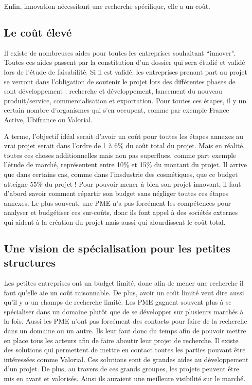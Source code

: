 \documentclass[a4paper,12pt]{report}
\begin{document}
		Enfin, innovation nécessitant une recherche spécifique, elle a un coût. 
		
			
		\subsection{Le coût élevé}
		Il existe de nombreuses aides pour toutes les entreprises souhaitant “innover”. Toutes ces aides passent par la constitution d’un dossier qui sera étudié et validé lors de l’étude de faisabilité. Si il est validé, les entreprises prenant part au projet se verront dans l’obligation de soutenir le projet lors des différentes phases de sont développement : recherche et développement, lancement du nouveau produit/service, commercialisation et exportation. Pour toutes ces étapes, il y un certain nombre d’organismes qui s’en occupent, comme par exemple France Active, Ubifrance ou Valorial\cite{AidesInnovation}. 
		
		A terme, l’objectif idéal serait d’avoir un coût pour toutes les étapes annexes au vrai projet serait dans l’ordre de 1 à 6\% du coût total du projet. Mais en réalité, toutes ces choses additionnelles mais non pas superflues, comme part exemple l’étude de marché, représentent entre 10\% et 15\% du montant du projet. Il arrive que dans certains cas, comme dans l’insdustrie des cosmétiques, que ce budget atteigne 55\% du projet ! Pour pouvoir mener à bien son projet innovant, il faut d’abord savoir comment répartir son budget sans négliger toutes ces étapes annexes. Le plus souvent, une PME n’a pas forcément les compétences pour analyser et budgétiser ces sur-coûts, donc ils font appel à des sociétés externes qui aident à la création du projet mais aussi qui alourdissent le coût total.
				
		\subsection{Une vision de spécialisation pour les petites structures}
		
		Les petites entreprises ont un budget limité, donc afin de mener une recherche il faut qu’elle aie un coût raisonnable. De plus, avoir un coût limité veut dire aussi qu’il y a un champs de recherche limité. Les PME gagnent souvent plus à se spécialiser dans un domaine plutôt que de se développer sur plusieurs marchés à la fois. Aussi les PME n’ont pas forcément des contacts pour faire de la recherche dans un domaine ou un autre. Ils leur faut donc du temps afin de pouvoir mettre en place tous les acteurs afin de faire aboutir leur projet de recherche. Il existe des solutions qui permettent de mettre en contact toutes les parties pouvant être intéressées comme Valorial. Ces solutions sont de grandes aides au développement d’un projet. De plus, au travers de ces grands groupes, les projets peuvent être mis en avant et valorisés. Ainsi ils auraient une meilleure visibilité sur le marché. 
	
\end{document}
